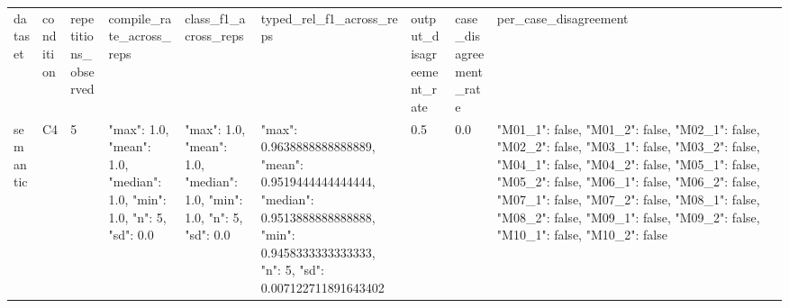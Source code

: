 \begin{tabular}{lllllllll}
dataset & condition & repetitions\_observed & compile\_rate\_across\_reps & class\_f1\_across\_reps & typed\_rel\_f1\_across\_reps & output\_disagreement\_rate & case\_disagreement\_rate & per\_case\_disagreement \\
semantic & C4 & 5 & {"max": 1.0, "mean": 1.0, "median": 1.0, "min": 1.0, "n": 5, "sd": 0.0} & {"max": 1.0, "mean": 1.0, "median": 1.0, "min": 1.0, "n": 5, "sd": 0.0} & {"max": 0.9638888888888889, "mean": 0.9519444444444444, "median": 0.9513888888888888, "min": 0.9458333333333333, "n": 5, "sd": 0.007122711891643402} & 0.5 & 0.0 & {"M01\_1": false, "M01\_2": false, "M02\_1": false, "M02\_2": false, "M03\_1": false, "M03\_2": false, "M04\_1": false, "M04\_2": false, "M05\_1": false, "M05\_2": false, "M06\_1": false, "M06\_2": false, "M07\_1": false, "M07\_2": false, "M08\_1": false, "M08\_2": false, "M09\_1": false, "M09\_2": false, "M10\_1": false, "M10\_2": false} \\
\end{tabular}